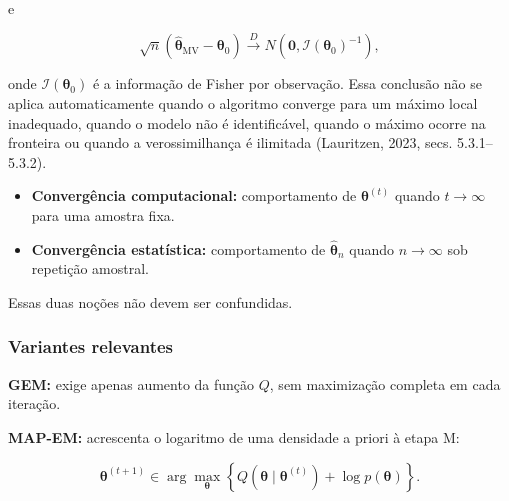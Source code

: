 \documentclass[
  letterpaper,
  DIV=11,
  numbers=noendperiod]{scrreprt}
\providecommand{\tightlist}{%
  \setlength{\itemsep}{0pt}\setlength{\parskip}{0pt}}\usepackage{longtable,booktabs,array}
\begin{document}
e

\[\sqrt{n}
\left(
\widehat{\boldsymbol{\theta}}_{\mathrm{MV}}
-
\boldsymbol{\theta}_0
\right)
\xrightarrow{D}
N\left(
\boldsymbol{0},
\mathcal{I}(\boldsymbol{\theta}_0)^{-1}
\right),\]

onde \(\mathcal{I}(\boldsymbol{\theta}_0)\) é a informação de Fisher por
observação. Essa conclusão não se aplica automaticamente quando o
algoritmo converge para um máximo local inadequado, quando o modelo não
é identificável, quando o máximo ocorre na fronteira ou quando a
verossimilhança é ilimitada (Lauritzen, 2023, secs. 5.3.1--5.3.2).

\begin{tcolorbox}[enhanced jigsaw, colback=white, leftrule=.75mm, colbacktitle=quarto-callout-note-color!10!white, breakable, titlerule=0mm, bottomtitle=1mm, title=\textcolor{quarto-callout-note-color}{\faInfo}\hspace{0.5em}{Distinção conceitual}, colframe=quarto-callout-note-color-frame, toprule=.15mm, opacityback=0, bottomrule=.15mm, opacitybacktitle=0.6, arc=.35mm, toptitle=1mm, rightrule=.15mm, coltitle=black, left=2mm]

\begin{itemize}
\tightlist
\item
  \textbf{Convergência computacional:} comportamento de
  \(\boldsymbol{\theta}^{(t)}\) quando \(t\to\infty\) para uma amostra
  fixa.
\item
  \textbf{Convergência estatística:} comportamento de
  \(\widehat{\boldsymbol{\theta}}_n\) quando \(n\to\infty\) sob
  repetição amostral.
\end{itemize}

Essas duas noções não devem ser confundidas.

\end{tcolorbox}

\subsubsection{Variantes relevantes}\label{variantes-relevantes}

\textbf{GEM:} exige apenas aumento da função \(Q\), sem maximização
completa em cada iteração.

\textbf{MAP-EM:} acrescenta o logaritmo de uma densidade a priori à
etapa M:

\[\boldsymbol{\theta}^{(t+1)}
\in
\arg\max_{\boldsymbol{\theta}}
\left
\{
Q(\boldsymbol{\theta}\mid\boldsymbol{\theta}^{(t)})
+
\log p(\boldsymbol{\theta})
\right\}.\]
\end{document}
